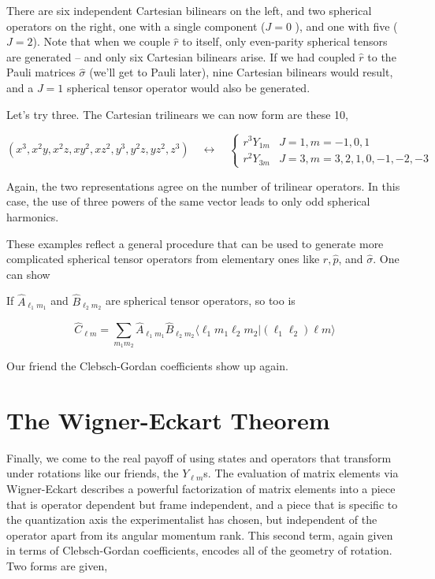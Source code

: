 There are six independent Cartesian bilinears on the left, and two spherical
operators on the right, one with a single component ($J=0$ ), and one with five
($J=2$). Note that when we couple  $\hat{r}$ to itself, only even-parity
spherical tensors are generated -- and only six Cartesian bilinears arise. If
we had coupled $\hat{r}$ to the Pauli matrices $\hat{\sigma}$ (we'll get to
Pauli later), nine Cartesian bilinears would result, and a $J=1$ spherical
tensor operator would also be generated. 

Let's try three. The Cartesian trilinears we can now form are these 10, 

\[
  (x^3, x^2y, x^2z, xy^2, xz^2, y^3, y^2z, yz^2, z^3) \quad \leftrightarrow
  \quad \begin{cases}
     r^3Y_{1m} &J=1, m = -1, 0, 1 \\ r^2Y_{3m} &J = 3, m= 3, 2, 1,
    0, -1, -2, -3
  \end{cases} 
\] \vspace{3px}


Again, the two representations agree on the number of trilinear operators. In
this case, the use of three powers of the same vector leads to only odd
spherical harmonics. 

These examples reflect a general procedure that can be used to generate more
complicated spherical tensor operators from elementary ones like $\hat{r},
\hat{p}$, and $\hat{\sigma}$. One can show 

\begin{subbox}{}
  If $\hat{A}_{\ell_1m_1}$ and $\hat{B}_{\ell_2m_2}$ are spherical tensor
  operators, so too is 

  \[ \hat{C}_{\ell m} = \sum_{m_1m_2}^{} \hat{A}_{\ell_1 m_1}
    \hat{B}_{\ell_2m_2} \langle \ell_1m_1 \ell_2m_2| (\ell_1 \ell_2 ) \ell
  m \rangle\] 
\end{subbox}

Our friend the Clebsch-Gordan coefficients show up again. 

\section{The Wigner-Eckart Theorem}

Finally, we come to the real payoff of using states and operators that
transform under rotations like our friends, the $Y_{\ell m}$s. The evaluation
of matrix elements via Wigner-Eckart describes a powerful factorization of
matrix elements into a piece that is operator dependent but frame independent,
and a piece that is specific to the quantization axis the experimentalist has
chosen, but independent of the operator apart from its angular momentum rank.
This second term, again given in terms of Clebsch-Gordan coefficients, encodes
all of the geometry of rotation. Two forms are given, 


